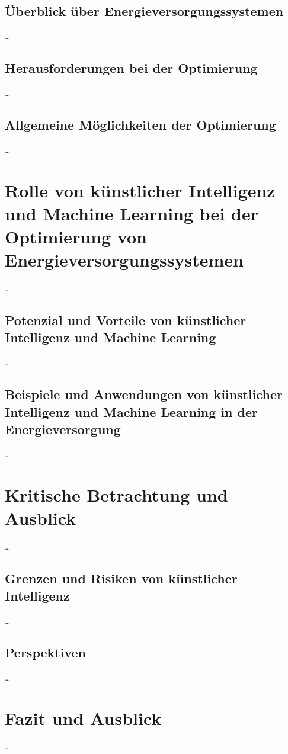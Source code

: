 \documentclass[
11pt, 
a4paper,
DIV = 14,
twoside,
twocolumn, %
parskip =half, %
headsepline, %
openright, %
]{scrreprt}
\begin{document}
	\section{Überblick über Energieversorgungssystemen}
	\ldots
	\section{Herausforderungen bei der Optimierung}
	\ldots
	\section{Allgemeine Möglichkeiten der Optimierung}
	\ldots
	

	\chapter{Rolle von künstlicher Intelligenz und Machine Learning bei der Optimierung von Energieversorgungssystemen}
	\ldots
	\section{Potenzial und Vorteile von künstlicher Intelligenz und Machine Learning}
	\ldots
	\section{Beispiele und Anwendungen von künstlicher Intelligenz und Machine Learning in der Energieversorgung}
	\ldots


	\chapter{Kritische Betrachtung und Ausblick}
	\ldots
	\section{Grenzen und Risiken von künstlicher Intelligenz}
	\ldots
	\section{Perspektiven}
	\ldots


	\chapter{Fazit und Ausblick}
	\ldots
\end{document}
